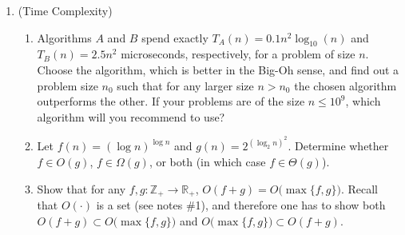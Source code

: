 \documentclass[11pt]{article}
\newcommand{\R}{\mathbb{R}}
\newcommand{\Z}{\mathbb{Z}}
\begin{document}
\begin{enumerate}
  
  

\item (Time Complexity)

\begin{enumerate} 
\item Algorithms $A$ and $B$ spend exactly $T_{A}(n) = 0.1n^{2} \log_{10} (n)$ and $T_{B}(n) = 2.5n^{2}$ microseconds, respectively, for a problem of size $n$. Choose the algorithm, which is better in the Big-Oh sense, and find out a problem size $n_{0}$ such that for any larger size $n > n_{0}$ the chosen algorithm outperforms the other. If your problems are of the size $n \leq 10^{9}$, which algorithm will you recommend to use?
\item Let $f(n) = (\log n)^{\log n}$ and $g(n) = 2^{(\log_{2} n)^{2}}$. Determine whether $f \in O(g)$, $f \in \Omega(g)$, or both (in which case $f \in \Theta(g)$).
\item Show that for any $f,g: \Z_{+} \to \R_{+}$, $O(f+g) = O\bigl(\max\{f,g\}\bigr)$. Recall that $O(\cdot)$ is a set (see notes \#1), and therefore one has to show both $O(f+g) \subset O\bigl(\max\{f,g\}\bigr )$ and $O\bigl (\max\{f,g\} \bigr ) \subset O(f+g)$.


\end{enumerate}
\end{enumerate}
\end{document}
